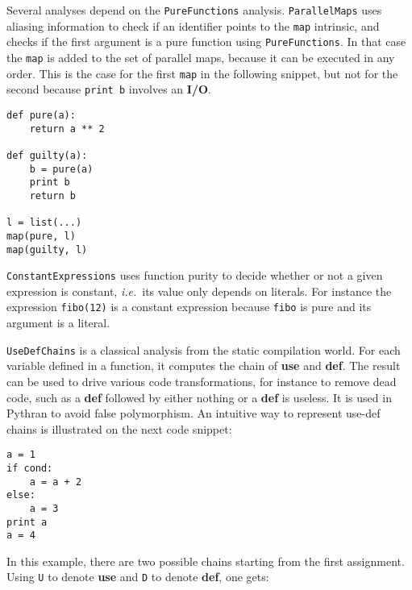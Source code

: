 \documentclass[10pt, onecolumn, preprint]{sigplanconf}
\providecommand{\ie}[1][~]{\textit{i.e.}#1}
\begin{document}
Several analyses depend on the \texttt{PureFunctions} analysis.
\texttt{ParallelMaps} uses aliasing information to check if an identifier
points to the \texttt{map} intrinsic, and checks if the first argument is a
pure function using \texttt{PureFunctions}. In that case the \texttt{map} is
added to the set of parallel maps, because it can be executed in any order.
This is the case for the first \texttt{map} in the following snippet, but not
for the second because \texttt{print b} involves an \textbf{I/O}.

\begin{lstlisting}
def pure(a):
    return a ** 2

def guilty(a):
    b = pure(a)
    print b
    return b

l = list(...)
map(pure, l)
map(guilty, l)
\end{lstlisting}

\texttt{ConstantExpressions} uses function purity to decide whether or not a given expression
is constant, \ie{its value only depends on literals}. For instance the
expression \texttt{fibo(12)} is a constant expression because \texttt{fibo} is pure and its
argument is a literal. 

\texttt{UseDefChains} is a classical analysis from the static compilation world. For
each variable defined in a function, it computes the chain of \textbf{use} and \textbf{def}.
The result can be used to drive various code transformations, for instance to
remove dead code, such as a \textbf{def} followed by either nothing or a 
\textbf{def} is useless. 
It is used in Pythran to avoid false polymorphism. An intuitive way to represent
use-def chains is illustrated on the next code snippet:

\begin{lstlisting}
a = 1
if cond:
    a = a + 2
else:
    a = 3
print a
a = 4
\end{lstlisting}

In this example, there are two possible chains starting from the first
assignment. Using \texttt{U} to denote \textbf{use} and \texttt{D} to denote \textbf{def}, one gets:
\end{document}
